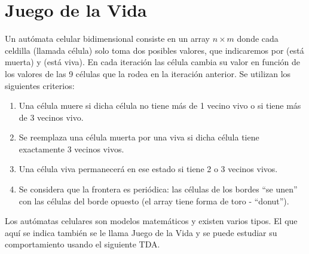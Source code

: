 %
%
%
%
%
%
%




\separacion
\section{Juego de la Vida}


Un autómata celular bidimensional consiste en un array $n\times m$ donde cada celdilla (llamada célula) solo toma dos posibles valores, que indicaremos por  (está muerta) y  (está viva). En cada iteración las célula cambia su valor en función de los valores de las 9 células que la rodea en la iteración anterior. Se utilizan los siguientes criterios: 
\begin{enumerate}
\item Una célula muere  si dicha célula no tiene más de 1 vecino vivo o si tiene más de 3 vecinos vivo.

\item Se reemplaza una célula muerta por una viva si dicha célula tiene exactamente 3 vecinos vivos.

\item Una célula viva permanecerá en ese estado si tiene 2 o 3 vecinos vivos. 

\item Se considera que la frontera es periódica: las células de los bordes ``se unen'' con las células del borde opuesto (el array tiene forma de toro - ``donut'').
\end{enumerate}

Los autómatas celulares son modelos matemáticos y existen varios tipos. El que aquí se indica también se le llama Juego de la Vida y se puede estudiar su comportamiento usando el siguiente TDA.



